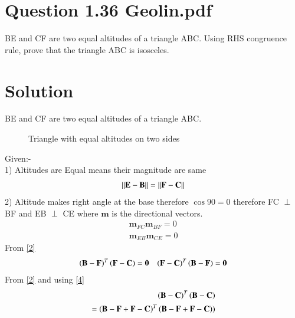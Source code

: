 \documentclass[journal,12pt,twocolumn]{IEEEtran}
\begin{document}
\section{Question 1.36 Geolin.pdf }
BE and CF are two equal altitudes of a triangle ABC. Using RHS congruence rule, prove that the triangle ABC is isosceles.
\section{Solution}
BE and CF are two equal altitudes of a triangle ABC.
\captionsetup{justification=centering}
\begin{figure}[!h]
\centering
\resizebox{.5\columnwidth}{!}
{
}
\caption{Triangle with equal altitudes on two sides}
\label{myfig}
\end{figure}
Given:-\\
1) Altitudes are Equal means their magnitude are same
 \begin{align}
 	\left\lVert\mathbf{E} - \mathbf{B}\right\rVert = \left\lVert\mathbf{F} - \mathbf{C}\right\rVert \label{1}
 \end{align}
2) Altitude makes right angle at the base therefore $\cos 90 =0$ therefore  FC $\perp$ BF and EB $\perp$ CE where $\textbf{m}$ is the directional vectors.
\begin{align}
\textbf{m}_{FC} \textbf{m}_{BF} = 0 \label{2}\\
\textbf{m}_{EB} \textbf{m}_{CE} = 0 \label{3}
\end{align}
From \eqref{2}
\begin{align}
    \left(\mathbf{B}-\mathbf{F}\right)^T\left(\mathbf{F}-\mathbf{C}\right)=\mathbf{0} && \left(\mathbf{F}-\mathbf{C}\right)^T\left(\mathbf{B}-\mathbf{F}\right)=\mathbf{0}\label{4}
\end{align}
From \eqref{2} and using \eqref{4} 
\begin{align}
    \left(\mathbf{B}-\mathbf{C}\right)^T\left(\mathbf{B}-\mathbf{C}\right)\\
    =\left(\mathbf{B}-\mathbf{F}+\mathbf{F}-\mathbf{C}\right)^T\left(\mathbf{B}-\mathbf{F}+\mathbf{F}-\mathbf{C}\right))
    \end{align}
\end{document}
